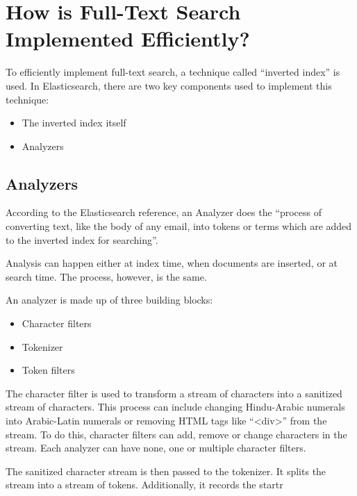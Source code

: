 \chapter{How is Full-Text Search Implemented Efficiently?}

To efficiently implement full-text search, a technique called “inverted index” is used. In Elasticsearch, there are two key components used to implement this technique:
\begin{itemize}
    \item The inverted index itself
    \item Analyzers
\end{itemize}

\section{Analyzers}
According to the Elasticsearch reference, an Analyzer does the “process of converting text, like the body of any email, into tokens or terms which are added to the inverted index for searching”.

Analysis can happen either at index time, when documents are inserted, or at search time. The process, however, is the same.

An analyzer is made up of three building blocks:
\begin{itemize}
    \item Character filters
    \item Tokenizer
    \item Token filters
\end{itemize}

The character filter is used to transform a stream of characters into a sanitized stream of characters. This process can include changing Hindu-Arabic numerals into Arabic-Latin numerals or removing HTML tags like “<div>” from the stream. To do this, character filters can add, remove or change characters in the stream. Each analyzer can have none, one or multiple character filters.

The sanitized character stream is then passed to the tokenizer. It splits the stream into a stream of tokens. Additionally, it records the startr
